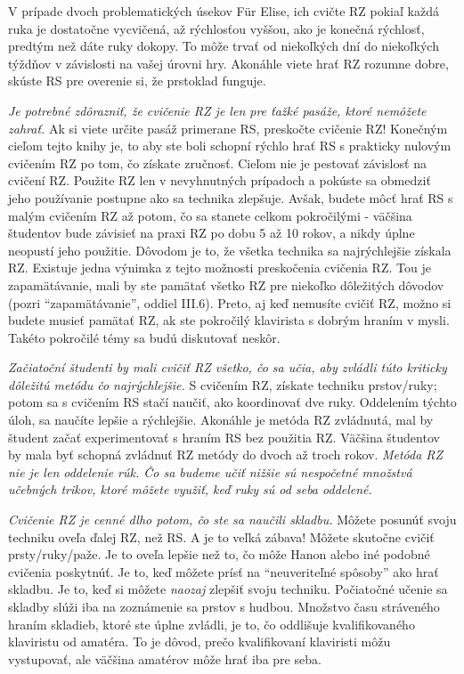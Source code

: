 V prípade dvoch problematických úsekov Für Elise, ich cvičte RZ pokiaľ každá ruka je dostatočne vycvičená, až rýchlosťou vyššou, ako je konečná rýchlosť, predtým než dáte ruky dokopy. To môže trvať od niekoľkých dní do niekoľkých týždňov v závislosti na vašej úrovni hry. Akonáhle viete hrať RZ rozumne dobre, skúste RS pre overenie si, že prstoklad funguje.

\emph{Je potrebné zdôrazniť, že cvičenie RZ je len pre ťažké pasáže, ktoré nemôžete zahrať.} Ak si viete určite pasáž primerane RS, preskočte cvičenie RZ! Konečným cieľom tejto knihy je, to aby ste boli schopní rýchlo hrať RS s prakticky nulovým cvičením RZ po tom, čo získate zručnosť. Cieľom nie je pestovať závislosť na cvičení RZ. Použite RZ len v nevyhnutných prípadoch a pokúste sa obmedziť jeho používanie postupne ako sa technika zlepšuje. Avšak, budete môcť hrať RS s malým cvičením RZ až potom, čo sa stanete celkom pokročilými - väčšina študentov bude závisieť na praxi RZ po dobu 5 až 10 rokov, a nikdy úplne neopustí jeho použitie. Dôvodom je to, že všetka technika sa najrýchlejšie získala RZ. Existuje jedna výnimka z tejto možnosti preskočenia cvičenia RZ. Tou je zapamätávanie, mali by ste pamätať všetko RZ pre niekoľko dôležitých dôvodov (pozri “zapamätávanie”, oddiel III.6). Preto, aj keď nemusíte cvičiť RZ, možno si budete musieť pamätať RZ, ak ste pokročilý klavirista s dobrým hraním v mysli. Takéto pokročilé témy sa budú diskutovať neskôr.

\emph{Začiatoční študenti by mali cvičiť RZ všetko, čo sa učia, aby zvládli túto kriticky dôležitú metódu čo najrýchlejšie.} S cvičením RZ, získate techniku prstov/ruky; potom sa s cvičením RS stačí naučiť, ako koordinovať dve ruky. Oddelením týchto úloh, sa naučíte lepšie a rýchlejšie. Akonáhle je metóda RZ zvládnutá, mal by študent začať experimentovať s hraním RS bez použitia RZ. Väčšina študentov by mala byť schopná zvládnuť RZ metódy do dvoch až troch rokov. \emph{Metóda RZ nie je len oddelenie rúk. Čo sa budeme učiť nižšie sú nespočetné množstvá učebných trikov, ktoré môžete využiť, keď ruky sú od seba oddelené.}

\emph{Cvičenie RZ je cenné dlho potom, čo ste sa naučili skladbu.} Môžete posunúť svoju techniku oveľa ďalej RZ, než RS. A je to veľká zábava! Môžete skutočne cvičiť prsty/ruky/paže. Je to oveľa lepšie než to, čo môže Hanon alebo iné podobné cvičenia poskytnúť. Je to, keď môžete prísť na “neuveriteľné spôsoby” ako hrať skladbu. Je to, keď si môžete \textit{naozaj} zlepšiť svoju techniku. Počiatočné učenie sa skladby slúži iba na zoznámenie sa prstov s hudbou. Množstvo času stráveného hraním  skladieb, ktoré ste úplne zvládli, je to, čo oddlišuje kvalifikovaného klaviristu od amatéra. To je dôvod, prečo kvalifikovaní klaviristi môžu vystupovať, ale väčšina amatérov môže hrať iba pre seba.

